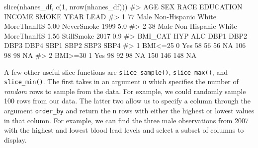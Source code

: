 \documentclass[
  letterpaper,
]{latex/krantz}
\makeatletter
\newenvironment{Shaded}{\begin{snugshade}}{\end{snugshade}}
\newcommand{\CommentTok}[1]{\textcolor[rgb]{0.37,0.37,0.37}{#1}}
\newcommand{\DecValTok}[1]{\textcolor[rgb]{0.68,0.00,0.00}{#1}}
\newcommand{\FunctionTok}[1]{\textcolor[rgb]{0.28,0.35,0.67}{#1}}
\newcommand{\NormalTok}[1]{\textcolor[rgb]{0.00,0.23,0.31}{#1}}
\newenvironment{kframe}{%
\medskip{}
\setlength{\fboxsep}{.8em}
 \def\at@end@of@kframe{}%
 \ifinner\ifhmode%
  \def\at@end@of@kframe{\end{minipage}}%
  \begin{minipage}{\columnwidth}%
 \fi\fi%
 \def\FrameCommand##1{\hskip\@totalleftmargin \hskip-\fboxsep
 \colorbox{shadecolor}{##1}\hskip-\fboxsep
     \hskip-\linewidth \hskip-\@totalleftmargin \hskip\columnwidth}%
 \MakeFramed {\advance\hsize-\width
   \@totalleftmargin\z@ \linewidth\hsize
   \@setminipage}}%
 {\par\unskip\endMakeFramed%
 \at@end@of@kframe}
\renewenvironment{Shaded}{\begin{kframe}}{\end{kframe}}
\makeatother
\begin{document}
\begin{Shaded}
\begin{Highlighting}[]
\FunctionTok{slice}\NormalTok{(nhanes\_df, }\FunctionTok{c}\NormalTok{(}\DecValTok{1}\NormalTok{, }\FunctionTok{nrow}\NormalTok{(nhanes\_df)))}
\CommentTok{\#\textgreater{}   AGE  SEX               RACE  EDUCATION INCOME      SMOKE YEAR LEAD}
\CommentTok{\#\textgreater{} 1  77 Male Non{-}Hispanic White MoreThanHS   5.00 NeverSmoke 1999  5.0}
\CommentTok{\#\textgreater{} 2  38 Male Non{-}Hispanic White MoreThanHS   1.56 StillSmoke 2017  0.9}
\CommentTok{\#\textgreater{}   BMI\_CAT HYP ALC DBP1 DBP2 DBP3 DBP4 SBP1 SBP2 SBP3 SBP4}
\CommentTok{\#\textgreater{} 1 BMI\textless{}=25   0 Yes   58   56   56   NA  106   98   98   NA}
\CommentTok{\#\textgreater{} 2 BMI\textgreater{}=30   1 Yes   98   92   98   NA  150  146  148   NA}
\end{Highlighting}
\end{Shaded}

A few other useful slice functions are
\texttt{slice\_sample()},
\texttt{slice\_max()},
and
\texttt{slice\_min()}.
The first takes in an argument \texttt{n} which specifies the number of
\emph{random} rows to sample from the data. For example, we could
randomly sample 100 rows from our data. The latter two allow us to
specify a column through the argument \texttt{order\_by} and return the
\texttt{n} rows with either the highest or lowest values in that column.
For example, we can find the three male observations from 2007 with the
highest and lowest blood lead levels and select a subset of columns to
display.
\end{document}
